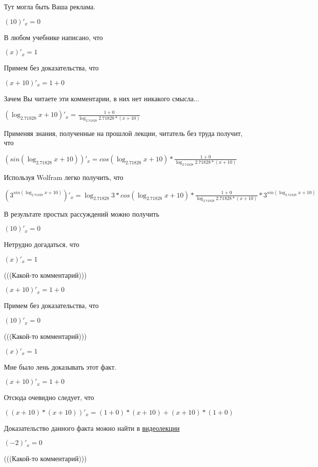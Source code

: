 \documentclass[12pt,a4paper,fleqn]{article}
\theoremstyle{definition}
\begin{document}
Тут могла быть Ваша реклама. 

$( 10 )'_{x} =  0 $

В любом учебнике написано, что 

$( x )'_{x} =  1 $

Примем без доказательства, что 

$( x  +  10 )'_{x} =  1  +  0 $

Зачем Вы читаете эти комментарии, в них нет никакого смысла... 

$(\log_{ 2.71828 }{ x  +  10 })'_{x} = \frac{ 1  +  0 }{\log_{ 2.71828 }{ 2.71828 } * ( x  +  10 )}
$

Применяя знания, полученные на прошлой лекции, читатель без труда получит, что 

$(sin(\log_{ 2.71828 }{ x  +  10 }))'_{x} = cos(\log_{ 2.71828 }{ x  +  10 }) * \frac{ 1  +  0 }{\log_{ 2.71828 }{ 2.71828 } * ( x  +  10 )}
$

Используя Wolfram легко получить, что 

$({ 3 }^{sin(\log_{ 2.71828 }{ x  +  10 })})'_{x} = \log_{ 2.71828 }{ 3 } * cos(\log_{ 2.71828 }{ x  +  10 }) * \frac{ 1  +  0 }{\log_{ 2.71828 }{ 2.71828 } * ( x  +  10 )}
 * { 3 }^{sin(\log_{ 2.71828 }{ x  +  10 })}$

В результате простых рассуждений можно получить 

$( 10 )'_{x} =  0 $

Нетрудно догадаться, что 

$( x )'_{x} =  1 $

(((Какой-то комментарий))) 

$( x  +  10 )'_{x} =  1  +  0 $

Примем без доказательства, что 

$( 10 )'_{x} =  0 $

(((Какой-то комментарий))) 

$( x )'_{x} =  1 $

Мне было лень доказывать этот факт.

$( x  +  10 )'_{x} =  1  +  0 $

Отсюда очевидно следует, что 

$(( x  +  10 ) * ( x  +  10 ))'_{x} = ( 1  +  0 ) * ( x  +  10 ) + ( x  +  10 ) * ( 1  +  0 )$

Доказательство данного факта можно найти в \href{https://www.youtube.com/watch?v=dQw4w9WgXcQ}{видеолекции} 

$( -2 )'_{x} =  0 $

(((Какой-то комментарий))) 
\end{document}
